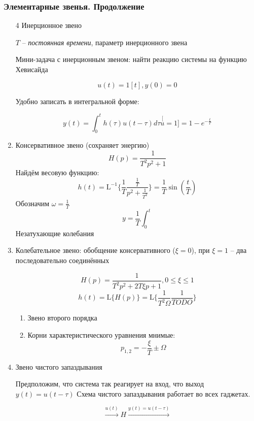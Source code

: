 \documentclass[main.tex]{subfiles}
\begin{document}
\subsubsection{Элементарные звенья. Продолжение}

\begin{enumerate}[noitemsep] %
    \item[4] Инерционное звено %

    $ T $ -- \emph{постоянная времени}, параметр инерционного звена

    Мини-задача с инерционным звеном: найти реакцию системы на функцию Хевисайда

    $$ u(t) = 1[t], y(0) = 0 $$

    Удобно записать в интегральной форме:

    $$ y(t) = \int_0^t h(\tau) u(t-\tau) d\tau \overset[u = 1]= 1 - e^{-\frac{t}{T}} $$

    \item Консервативное звено (сохраняет энергию)
    $$ H(p) = \frac{1}{T^2p^2 + 1} $$
    Найдём весовую функцию:
    $$ h(t) = \mathrm{L}^{-1}\{\frac{1}{T} \frac{\frac{1}{T}}{p^2 + \frac{1}{T^2}}\} = \frac{1}{T} \sin(\frac{t}{T}) $$
    Обозначим $ \omega = \frac{1}{T} $
    $$ y = \frac{1}{T} \int_0^t $$ %
    Незатухающие колебания

    \item Колебательное звено: обобщение консервативного ($\xi = 0$), при $\xi=1$ -- два последовательно соединённых %

    $$ H(p) = \frac{1}{T^2p^2 + 2 T \xi p + 1}, 0 \le \xi \le 1 $$
    $$ h(t) = \mathrm{L}\{H(p)\} = \mathrm{L}\{\frac{1}{T^2 \Omega} \frac{1}{TODO}\} $$ %

    \begin{enumerate}[noitemsep]
        \item Звено второго порядка
        \item Корни характеристического уравнения мнимые:
        $$ p_{1,2} = - \frac{\xi}{T} \pm \Omega $$
    \end{enumerate}

    \item Звено чистого запаздывания

    Предположим, что система так реагирует на вход, что выход $ y(t) = u(t-\tau) $
    Схема чистого запаздывания работает во всех гаджетах.

    $$ \xrightarrow{u(t)} \boxed{H} \xrightarrow{y(t)=u(t-\tau)} $$


\end{enumerate}
\end{document}
